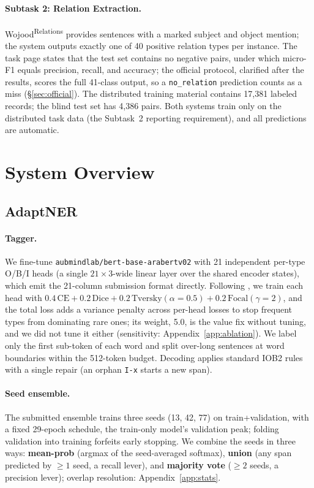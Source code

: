 \documentclass[11pt]{article}
\newcommand{\WojoodRel}{Wojood\textsuperscript{Relations}}
\begin{document}
\paragraph{Subtask 2: Relation Extraction.} \WojoodRel{} provides
sentences with a marked subject and object mention; the system outputs
exactly one of 40 positive relation types per instance. The task page
states that the test set contains no negative pairs, under which micro-F1
equals precision, recall, and accuracy; the official protocol, clarified
after the results, scores the full 41-class output, so a
\texttt{no\_relation} prediction counts as a miss
(\S\ref{sec:official}). The distributed training material
contains 17,381 labeled records; the blind test set has 4,386 pairs. Both
systems train only on the distributed task data (the Subtask~2 reporting
requirement), and all predictions are automatic.

\section{System Overview}

\subsection{AdaptNER}

\paragraph{Tagger.} We fine-tune
\texttt{aubmindlab/bert-base-arabertv02} with 21 independent per-type
O/B/I heads (a single $21{\times}3$-wide linear layer over the shared
encoder states), which emit the 21-column submission format directly.
Following \citet{mahdaouy-etal-2023-um6p}, we train each head with
$0.4\,\mathrm{CE} + 0.2\,\mathrm{Dice} +
0.2\,\mathrm{Tversky}(\alpha{=}0.5) + 0.2\,\mathrm{Focal}(\gamma{=}2)$,
and the total loss adds a variance penalty across per-head
losses to stop frequent types from dominating rare ones; its weight, 5.0,
is the value \citeauthor{mahdaouy-etal-2023-um6p} fix without tuning, and
we did not tune it either (sensitivity: Appendix~\ref{app:ablation}). We label only
the first sub-token of each word and split over-long sentences at word
boundaries within the 512-token budget. Decoding applies standard IOB2 rules with a single
repair (an orphan \texttt{I-x} starts a new span).

\paragraph{Seed ensemble.} The submitted ensemble trains three seeds (13,
42, 77) on train+validation, with a fixed 29-epoch schedule,
the train-only model's validation peak; folding validation into training
forfeits early stopping. We combine the seeds in
three ways: \textbf{mean-prob} (argmax of the seed-averaged softmax),
\textbf{union} (any span predicted by ${\geq}1$ seed, a
recall lever), and \textbf{majority vote} (${\geq}2$ seeds, a precision
lever); overlap resolution: Appendix~\ref{app:stats}.
\end{document}
